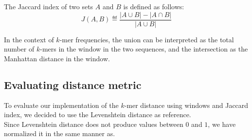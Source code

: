 The Jaccard index of two sets $A$ and $B$ is defined as follows:
\begin{equation}
  J(A, B) \eqdef \frac{|A \cup B| - |A \cap B|}{|A \cup B|}
\end{equation}

In the context of $k$-mer frequencies, the union can be interpreted as the
total number of $k$-mers in the window in the two sequences, and the
intersection as the Manhattan distance in the window.

\subsection{Evaluating distance metric}
To evaluate our implementation of the $k$-mer distance using windows and Jaccard index, we decided to use the Levenshtein distance as reference.\\
Since Levenshtein distance does not produce values between $0$ and $1$, we have normalized it in the same manner as.

